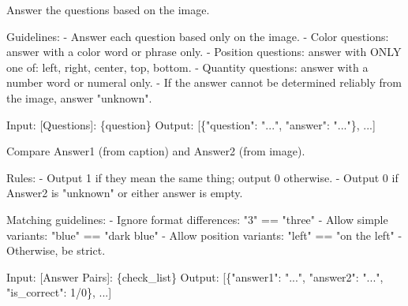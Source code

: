 \begin{tcolorbox}[promptbox={\textsc{ImageQA}: Answer questions grounded in the image}]
Answer the questions based on the image.

Guidelines:
- Answer each question based only on the image.
- Color questions: answer with a color word or phrase only.
- Position questions: answer with ONLY one of: left, right, center, top, bottom.
- Quantity questions: answer with a number word or numeral only.
- If the answer cannot be determined reliably from the image, answer "unknown".

\medskip
Input: [Questions]: \{question\} \newline
Output: [\{"question": "...", "answer": "..."\}, ...]
\end{tcolorbox}

\begin{tcolorbox}[promptbox={\textsc{AnswerCheck}: Compare caption answer vs.\ image answer}]
Compare Answer1 (from caption) and Answer2 (from image).

Rules:
- Output 1 if they mean the same thing; output 0 otherwise.
- Output 0 if Answer2 is "unknown" or either answer is empty.

Matching guidelines:
- Ignore format differences: "3" == "three"
- Allow simple variants: "blue" == "dark blue"
- Allow position variants: "left" == "on the left"
- Otherwise, be strict.

\medskip
Input: [Answer Pairs]: \{check\_list\} \newline
Output: [\{"answer1": "...", "answer2": "...", "is\_correct": 1/0\}, ...]
\end{tcolorbox}
